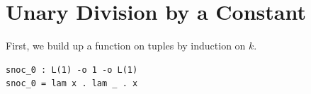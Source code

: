 \section{Unary Division by a Constant}
\label{app:divmod}

First, we build up a function on tuples by induction on $k$.

\begin{lstlisting}
snoc_0 : L(1) -o 1 -o L(1)
snoc_0 = lam x . lam _ . x
\end{lstlisting}